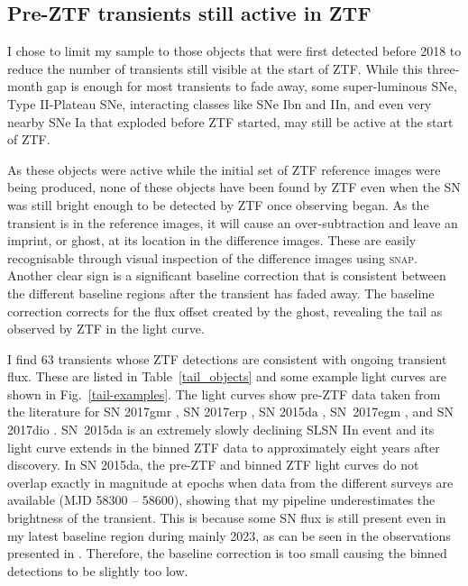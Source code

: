 \documentclass[a4paper,oneside,12pt, class=Latex/Classes/PhDthesisPSnPDF, crop=false]{standalone}
\begin{document}
\subsection{Pre-ZTF transients still active in ZTF}
\label{tails}
I chose to limit my sample to those objects that were first detected before 2018 to reduce the number of transients still visible at the start of ZTF. While this three-month gap is enough for most transients to fade away, some super-luminous SNe, Type II-Plateau SNe, interacting classes like SNe Ibn and IIn, and even very nearby SNe Ia that exploded before ZTF started, may still be active at the start of ZTF.

As these objects were active while the initial set of ZTF reference images were being produced, none of these objects have been found by ZTF even when the SN was still bright enough to be detected by ZTF once observing began. As the transient is in the reference images, it will cause an over-subtraction and leave an imprint, or ghost, at its location in the difference images. These are easily recognisable through visual inspection of the difference images using \textsc{snap}. Another clear sign is a significant baseline correction that is consistent between the different baseline regions after the transient has faded away. The baseline correction corrects for the flux offset created by the ghost, revealing the tail as observed by ZTF in the light curve.

I find 63 transients whose ZTF detections are consistent with ongoing transient flux. These are listed in Table~\ref{tail_objects} and some example light curves are shown in Fig.~\ref{tail-examples}. The light curves show pre-ZTF data taken from the literature for SN 2017gmr \cite[][]{2017gmr}, SN 2017erp \cite[][]{2017erp}, SN 2015da \cite[][]{2015da_2020}, SN~2017egm \cite[][]{2017egm}, and SN 2017dio \cite[][]{2017dio}. SN~2015da is an extremely slowly declining SLSN IIn event \citep{2015da_2020, 2015da_2024} and its light curve extends in the binned ZTF data to approximately eight years after discovery. In SN 2015da, the pre-ZTF and binned ZTF light curves do not overlap exactly in magnitude at epochs when data from the different surveys are available (MJD 58300 -- 58600), showing that my pipeline underestimates the brightness of the transient. This is because some SN flux is still present even in my latest baseline region during mainly 2023, as can be seen in the observations presented in \citet{2015da_2024}. Therefore, the baseline correction is too small causing the binned detections to be slightly too low.
\end{document}
